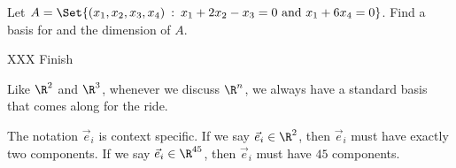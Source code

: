 \begin{example}
	Let $A=\Set{(x_1,x_2,x_3,x_4)\given x_1+2x_2-x_3=0\text{ and }x_1+6x_4=0}$. Find a basis for and the dimension
	of $A$.

	XXX Finish
\end{example}

Like $\R^2$ and $\R^3$, whenever we discuss $\R^n$, we always have a standard basis that comes
along for the ride.


The notation $\vec e_i$ is context specific. If we say $\vec e_i\in\R^2$,
then $\vec e_i$ must have exactly two components. If we say $\vec e_i\in\R^{45}$,
then $\vec e_i$ must have $45$ components. 
